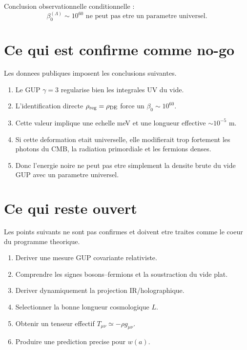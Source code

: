 \documentclass[11pt,a4paper]{article}
\newcommand{\rhoDE}{\rho_{\rm DE}}
\newcommand{\rhoReg}{\rho_{\rm reg}}
\begin{document}
Conclusion observationnelle conditionnelle :
\begin{equation}
\boxed{
\beta_0^{(\Lambda)}\sim10^{60}
\text{ ne peut pas etre un parametre universel.}
}
\label{eq:no_go}
\end{equation}

\section{Ce qui est confirme comme no-go}

Les donnees publiques imposent les conclusions suivantes.

\begin{enumerate}
  \item Le GUP $\gamma=3$ regularise bien les integrales UV du vide.
  \item L'identification directe $\rhoReg=\rhoDE$ force un
  $\beta_0\sim10^{60}$.
  \item Cette valeur implique une echelle meV et une longueur effective
  $\sim10^{-5}$ m.
  \item Si cette deformation etait universelle, elle modifierait trop fortement
  les photons du CMB, la radiation primordiale et les fermions denses.
  \item Donc l'energie noire ne peut pas etre simplement la densite brute du
  vide GUP avec un parametre universel.
\end{enumerate}

\section{Ce qui reste ouvert}

Les points suivants ne sont pas confirmes et doivent etre traites comme le coeur
du programme theorique.

\begin{enumerate}
  \item Deriver une mesure GUP covariante relativiste.
  \item Comprendre les signes bosons--fermions et la soustraction du vide plat.
  \item Deriver dynamiquement la projection IR/holographique.
  \item Selectionner la bonne longueur cosmologique $L$.
  \item Obtenir un tenseur effectif $T_{\mu\nu}\simeq-\rho g_{\mu\nu}$.
  \item Produire une prediction precise pour $w(a)$.
\end{enumerate}
\end{document}
